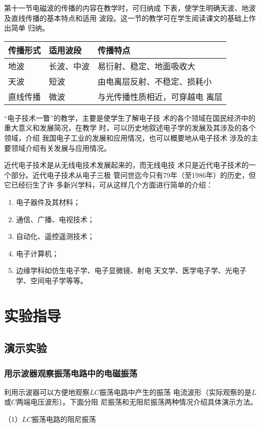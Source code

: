 第十一节电磁波的传播的内容在教学时，可归纳成
下表，使学生明确天波、地波及直线传播的基本特点和适用
波段。这一节的教学可在学生阅读课文的基础上作出简单
归纳。
\begin{center}
\begin{tabular}{lll}
\hline
传播形式&适用波段&传播特点\\
\hline
地波&长波、中波&易衍射、稳定、地面吸收大\\
天波&短波&由电离层反射、不稳定、损耗小\\
直线传播&微波&与光传播性质相近，可穿越电
离层\\
\hline
\end{tabular}
\end{center}

“电子技术一瞥”的教学，主要是使学生了解电子技
术的各个领域在国民经济中的重大意义和发展简况，在教学
时，可以历史地叙述电子学的发展及其涉及的各个领域，介绍
我国电子工业的发展和应用情况，也可以概要地从电子技术
涉及的主要领域介绍有关发展与应用情况。

近代电子技术是从无线电技术发展起来的，而无线电技
术只是近代电子技术的一个部分。近代电子技术从电子三极
管问世迄今只有79年（至1986年）的历史，但它已经衍生了许
多新兴学科，可从这样几个方面进行简单的介绍：
\begin{enumerate}
\item 电子器件及其材料；
\item 通信、广播、电视技术；
\item 自动化、遥控遥测技术；
\item 电子计算机；
\item 边缘学科如仿生电子学、电子显微镜、射电
天文学、医学电子学、光电子学、空间电子学等等。
\end{enumerate}

\section{实验指导}
\subsection{演示实验}
\subsubsection{用示波器观察振荡电路中的电磁振荡}
利用示波器可以方便地观察$LC$振荡电路中产生的振荡
电流波形（实际观察的是$L$或$C$两端电压波形）。下面分阻
尼振荡和无阻尼振荡两种情况介绍具体演示方法。

（1）$LC$振荡电路的阻尼振荡

